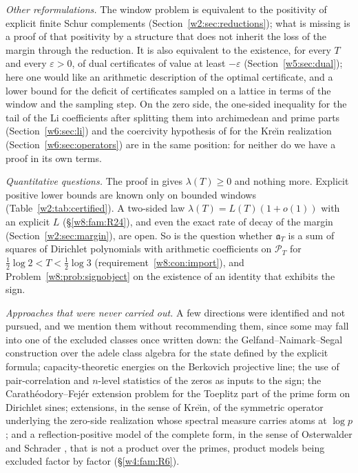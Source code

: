 \documentclass[11pt]{amsart}
\theoremstyle{definition}
\theoremstyle{remark}
\numberwithin{equation}{section}
\newcommand{\PT}{\mathcal{P}_T}                        %
\newcommand{\aT}{\mathfrak{a}_T}                       %
\newcommand{\lam}{\lambda(T)}                          %
\begin{document}
\emph{Other reformulations.} The window problem is equivalent to the positivity of explicit finite Schur
complements (Section~\ref{w2:sec:reductions}); what is missing is a proof of that positivity by a structure that
does not inherit the loss of the margin through the reduction. It is also equivalent to the existence, for every
$T$ and every $\varepsilon>0$, of dual certificates of value at least $-\varepsilon$
(Section~\ref{w5:sec:dual}); here one would like an arithmetic description of the optimal certificate, and a
lower bound for the deficit of certificates sampled on a lattice in terms of the window and the sampling step.
On the zero side, the one-sided inequality for the tail of the Li coefficients after splitting them into
archimedean and prime parts (Section~\ref{w6:sec:li}) and the coercivity hypothesis of \cite{P08} for the
Kre\u{\i}n realization (Section~\ref{w6:sec:operators}) are in the same position: for neither do we have
a proof in its own terms.

\emph{Quantitative questions.} The proof in \cite{P46} gives $\lam\ge0$ and nothing more. Explicit positive
lower bounds are known only on bounded windows (Table~\ref{w2:tab:certified}). A two-sided law
$\lam=L(T)(1+o(1))$ with an explicit $L$ (\S\ref{w8:fam:R24}), and even the exact rate of decay of the margin
(Section~\ref{w2:sec:margin}), are open. So is the question whether $\aT$ is a sum of squares of Dirichlet
polynomials with arithmetic coefficients on $\PT$ for $\frac12\log2<T<\frac12\log3$
(requirement~\ref{w8:con:import}), and Problem~\ref{w8:prob:signobject} on the existence of an identity that
exhibits the sign.

\emph{Approaches that were never carried out.} A few directions were identified and not pursued, and we mention
them without recommending them, since some may fall into one of the excluded classes once written down:
the Gelfand--Naimark--Segal construction over the adele
class algebra for the state defined by the explicit formula; capacity-theoretic energies on the Berkovich
projective line; the use of pair-correlation and $n$-level statistics of the zeros
\cite{Montgomery1973,RudnickSarnak1996} as inputs to the sign; the Carath\'eodory--Fej\'er extension problem for
the Toeplitz part of the prime form on Dirichlet sines; extensions, in the sense of Kre\u{\i}n, of the symmetric
operator underlying the zero-side realization whose spectral measure carries atoms at $\log p$;
and a reflection-positive model of the complete form, in the sense of Osterwalder and Schrader
\cite{OsterwalderSchrader1973}, that is not a product over the primes, product models being excluded factor by
factor (\S\ref{w4:fam:R6}).
\end{document}
